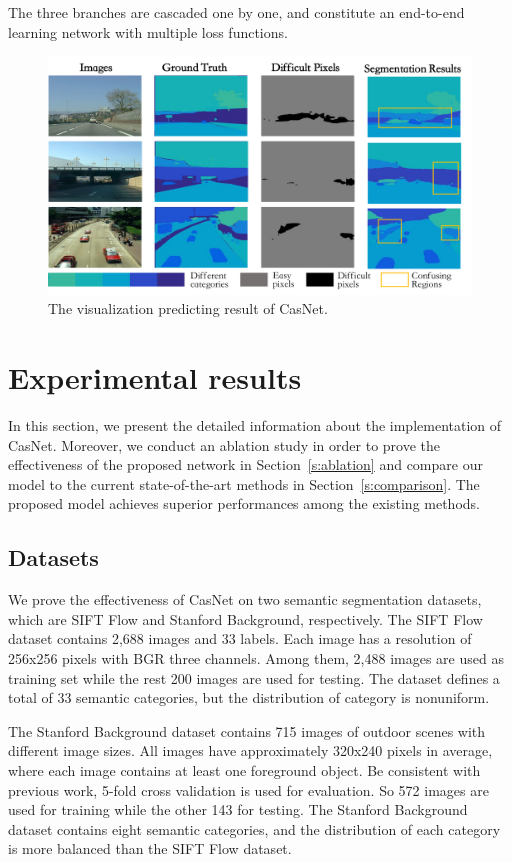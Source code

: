 \documentclass[10.5pt,compsoc]{TsT}
\newcommand{\upcite}[1]{\superscript{\textsuperscript{\cite{#1}}}}
\theoremstyle{mystyle}
\newcommand{\upcite}[1]{\textsuperscript{\cite{#1}}}
\begin{document}
{The three branches are cascaded one by one, and constitute an end-to-end learning network with multiple loss functions.


\begin{figure}[ht]
\centering
\includegraphics[width=1.9\columnwidth]{fig3.png}
\caption{The visualization predicting result of CasNet.}
\label{fig3}
\end{figure} 

\section{Experimental results}
\label{s:results}
\noindent
In this section, we present the detailed information about the implementation of CasNet. 
Moreover, we conduct an ablation study in order to prove the effectiveness of the proposed network in Section~\ref{s:ablation} and compare our model to the current state-of-the-art methods in Section~\ref{s:comparison}. The proposed model achieves superior performances among the existing methods.

\subsection{Datasets}
\noindent
We prove the effectiveness of CasNet on two semantic segmentation datasets, which are SIFT Flow\upcite{6} and Stanford Background\upcite{7}, respectively. The SIFT Flow dataset contains 2,688 images and 33 labels. Each image has a resolution of   256x256 pixels with BGR three channels. Among them, 2,488 images are used as training set while the rest 200 images are used for testing. The dataset defines a total of 33 semantic categories, but the distribution of category is nonuniform.

The Stanford Background dataset contains 715 images of outdoor scenes with different image sizes. All images have approximately 320x240 pixels in average, where each image contains at least one foreground object. Be consistent with previous work, 5-fold cross validation is used for evaluation. So 572 images are used for training while the other 143 for testing. The Stanford Background dataset contains eight semantic categories, and the distribution of each category is more balanced than the SIFT Flow dataset.


}
\end{document}
